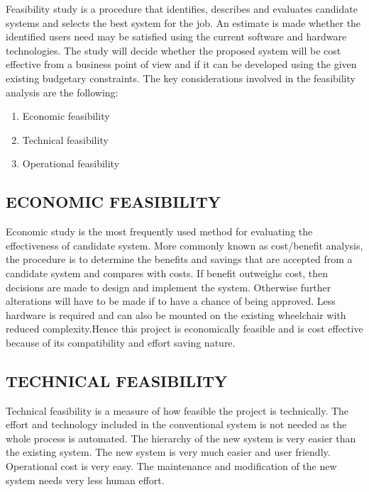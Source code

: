 \documentclass[11pt]{report} %
\begin{document}
Feasibility study is a procedure that identifies, describes and evaluates candidate systems and selects the best system for the job. An estimate is made whether the identified users need may be satisfied using the current software and hardware technologies. The study will decide whether the proposed system will be cost effective from a business point of view and if it can be developed using the given existing budgetary constraints. 
The key considerations involved in the feasibility analysis are the following:


\begin{enumerate}
	\item Economic feasibility
	\item Technical feasibility
	\item Operational feasibility
\end{enumerate}


\subsection{ECONOMIC FEASIBILITY}
\label{subsec:ECONOMIC FEASIBILITY}

Economic study is the most frequently used method for evaluating the effectiveness of candidate system. More commonly known as cost/benefit analysis, the procedure is to determine the benefits and savings that are accepted from a candidate system and compares with costs. If benefit outweighs cost, then decisions are made to design and implement the system. Otherwise further alterations will have to be made if to have a chance of being approved.
Less hardware is required and can also be mounted on the existing wheelchair with reduced complexity.Hence this project is economically feasible and is cost effective because of its compatibility and effort saving nature.


\subsection{TECHNICAL FEASIBILITY}
\label{subsec:TECHNICAL FEASIBILITY}

Technical feasibility is a measure of how feasible the project is technically. The effort and technology included in the conventional system is not needed as the whole process is automated.
The hierarchy of the new system is very easier than the existing system. The new system is very much easier and user friendly. Operational cost is very easy. The maintenance and modification of the new system needs very less human effort. 
\end{document}
